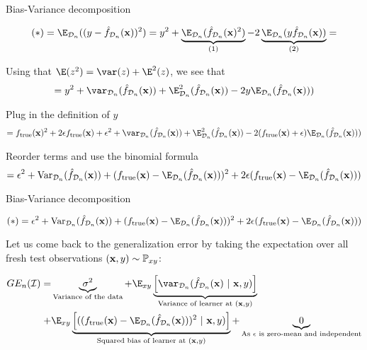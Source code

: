 \documentclass[11pt,compress,t,notes=noshow, xcolor=table]{beamer}
\begin{document}
\begin{frame2}[footnotesize]{Bias-Variance decomposition}

$$
(*) = \E_{\D_n}((y - \fh_{\D_n}(\xv))^2) = 
y^2 + \underbrace{\E_{\D_n}(\fh_{\D_n}(\xv)^2)}_{(1)}  - 2\underbrace{\E_{\D_n}(y\fh_{\D_n}(\xv))}_{(2)} =
$$

\vfill

Using that $\E(z^2) =\var(z) + \E^2(z)$, we see that
$$
= y^2 + \var_{\D_n}(\fh_{\D_n}(\xv)) + \E^2_{\D_n}(\fh_{\D_n}(\xv)) - 2y \E_{\D_n}(\fh_{\D_n}(\xv))) 
$$

\vfill

Plug in the definition of $y$
$$
= \ftrue(\xv)^2 +2\epsilon\ftrue(\xv) + \epsilon^2 + \var_{\D_n}(\fh_{\D_n}(\xv)) + \E^2_{\D_n}(\fh_{\D_n}(\xv)) - 2 (\ftrue(\xv)+\epsilon)\E_{\D_n}(\fh_{\D_n}(\xv))) 
$$

\vfill

Reorder terms and use the binomial formula
$$
= \epsilon^2 + \text{Var}_{\D_n}(\fh_{\D_n}(\xv)) + 
(\ftrue(\xv) - \E_{\D_n}(\fh_{\D_n}(\xv)))^2
+2 \epsilon (\ftrue(\xv) - \E_{\D_n}(\fh_{\D_n}(\xv)))
$$

\end{frame2}

\begin{frame2}[footnotesize]{Bias-Variance decomposition}

$$
(*) = \epsilon^2 + \text{Var}_{\D_n}(\fh_{\D_n}(\xv)) + 
(\ftrue(\xv) - \E_{\D_n}(\fh_{\D_n}(\xv)))^2
+2 \epsilon (\ftrue(\xv) - \E_{\D_n}(\fh_{\D_n}(\xv)))
$$

\vfill 

Let us come back to the generalization error by taking the expectation over all fresh test observations $(\mathbf{x}, y) \sim \mathbb{P}_{xy}$: 
\vfill

\begin{align*}
GE_n(\ind) 
=& \underbrace{\sigma^2}_{\text{Variance of the data}} + \E_{xy}\underbrace{\left[\var_{\D_n}(\fh_{\D_n}(\xv) ~|~\xv, y)\right]}_{\text{Variance of learner at } (\xv, y)} \\ 
+& \E_{xy}\underbrace{\left[((\ftrue(\xv)-\E_{\D_n}(\fh_{\D_n}(\xv)))^2~|~\xv, y)\right]}_{\text{Squared bias of learner at } (\xv, y)} + \underbrace{0}_{\text{As $\epsilon$ is zero-mean and independent}}
\end{align*}

\end{frame2}



\endlecture
\end{document}
